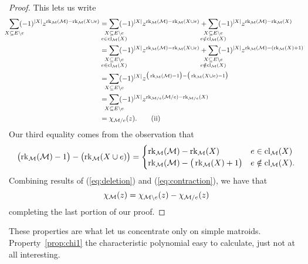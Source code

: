 \documentclass[12pt,oneside]{../../sfsuthesis}
\begin{document}
\begin{proof}
    This lets us write
    \begin{align*}
        \sum_{\mathclap{X \subseteq E \setminus e}} (-1)^{|X|} z^{\rk_\cM(\cM) - \rk_\cM(X \cup e)}
         & = \sum_{\mathclap{\substack{X \subseteq E \setminus e                                                                                \\ e \in \cl_\cM(X)}}} (-1)^{|X|} z^{\rk_\cM(\cM) - \rk_\cM(X \cup e)}
        + \sum_{\mathclap{\substack{X \subseteq E \setminus e                                                                                   \\ e \notin \cl_\cM(X)}}} (-1)^{|X|} z^{\rk_\cM(\cM) - \rk_\cM(X)} \\
         & = \sum_{\mathclap{\substack{X \subseteq E \setminus e                                                                                \\ e \in \cl_\cM(X)}}} (-1)^{|X|} z^{\rk_\cM(\cM) - \rk_\cM(X \cup e)}
        + \sum_{\mathclap{\substack{X \subseteq E \setminus e                                                                                   \\ e \notin \cl_\cM(X)}}} (-1)^{|X|} z^{\rk_\cM(\cM) - (\rk_\cM(X) + 1)} \\
         & = \sum_{\mathclap{\substack{X \subseteq E \setminus e}}} (-1)^{|X|} z^{\big(\rk_\cM(\cM) - 1\big) - \big(\rk_\cM(X \cup e) - 1\big)} \\
         & = \sum_{\mathclap{\substack{X \subseteq E \setminus e}}} (-1)^{|X|} z^{\rk_{\cM / e}(\cM / e) - \rk_{\cM / e}(X)}                    \\
         & = \chi_{\cM / e }(z). \tag{ii}\label{eq:contraction}
    \end{align*}
    Our third equality comes from the observation that
    \[
        \bigl( \operatorname{rk}_{\mathcal{M}}(\mathcal{M}) - 1 \bigr) - \bigl( \operatorname{rk}_{\mathcal{M}}(X \cup e )\bigr)
        = \begin{cases}
            \operatorname{rk}_{\mathcal{M}}( \mathcal{M} ) - \operatorname{rk}_{\mathcal{M}}(X)                 & e \in \operatorname{cl}_{\mathcal{M}}(X)     \\
            \operatorname{rk}_{\mathcal{M}}( \mathcal{M} ) - \big( \operatorname{rk}_{\mathcal{M}}(X) + 1 \big) & e \notin \operatorname{cl}_{\mathcal{M}}(X).
        \end{cases}
    \]
    Combining results of (\ref{eq:deletion}) and (\ref{eq:contraction}), we have that
    \[
        \chi_{\mathcal{M}}(z) = \chi_{\mathcal{M} \setminus e}(z) - \chi_{\mathcal{M} / e}(z)
    \]
    completing the last portion of our proof.

\end{proof}
These properties are what let us concentrate only on simple matroids.
Property~\ref{prop:chi1} the characteristic polynomial easy to calculate, just not at all interesting.
\end{document}
